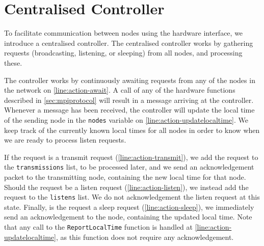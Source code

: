 \section{Centralised Controller}\label{sec:mpicontroller}


To facilitate communication between nodes using the hardware interface, we introduce a centralised controller. The centralised controller works by gathering requests (broadcasting, listening, or sleeping) from all nodes, and processing these.\medbreak

The controller works by continuously awaiting requests from any of the nodes in the network on \autoref{line:action-await}. A call of any of the hardware functions described in \autoref{sec:mpiprotocol} will result in a message arriving at the controller. Whenever a message has been received, the controller will update the local time of the sending node in the \texttt{nodes} variable on \autoref{line:action-updatelocaltime}. We keep track of the currently known local times for all nodes in order to know when we are ready to process listen requests. \smallbreak

If the request is a transmit request (\autoref{line:action-transmit}), we add the request to the \texttt{transmissions} list, to be processed later, and we send an acknowledgement packet to the transmitting node, containing the new local time for that node. Should the request be a listen request (\autoref{line:action-listen}), we instead add the request to the \texttt{listens} list. We do not acknowledgement the listen request at this state. Finally, is the request a sleep request (\autoref{line:action-sleep}), we immediately send an acknowledgement to the node, containing the updated local time. Note that any call to the \texttt{ReportLocalTime} function is handled at \autoref{line:action-updatelocaltime}, as this function does not require any acknowledgement.\smallbreak

